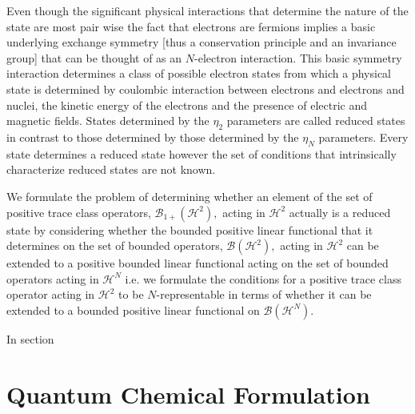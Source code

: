 \documentclass[aps,preprint]{revtex4}%
\begin{document}
Even though the significant physical interactions that determine the nature of
the state are most pair wise the fact that electrons are fermions implies a
basic underlying exchange symmetry [thus a conservation principle and an
invariance group] that can be thought of as an $N$-electron interaction. This
basic symmetry interaction determines a class of possible electron states from
which a physical state is determined by coulombic interaction between
electrons and electrons and nuclei, the kinetic energy of the electrons and
the presence of electric and magnetic fields. States determined by the
$\eta_{2}$ parameters are called reduced states in contrast to those
determined by those determined by the $\eta_{N}$ parameters. Every state
determines a reduced state however the set of conditions that intrinsically
characterize reduced states are not known.

We formulate the problem of determining whether an element of the set of
positive trace class operators, $\mathcal{B}_{1+}\left(  \mathcal{H}%
^{2}\right)  ,$ acting in $\mathcal{H}^{2}$ actually is a reduced state by
considering whether the bounded positive linear functional that it determines
on the set of bounded operators, $\mathcal{B}\left(  \mathcal{H}^{2}\right)
,$ acting in $\mathcal{H}^{2}$ can be extended to a positive bounded linear
functional acting on the set of bounded operators acting in $\mathcal{H}^{N}$
i.e. we formulate the conditions for a positive trace class operator acting in
$\mathcal{H}^{2}$ to be $N$-representable in terms of whether it can be
extended to a bounded positive linear functional on $\mathcal{B}\left(
\mathcal{H}^{N}\right)  .$

In section

\section{Quantum Chemical Formulation}
\end{document}
